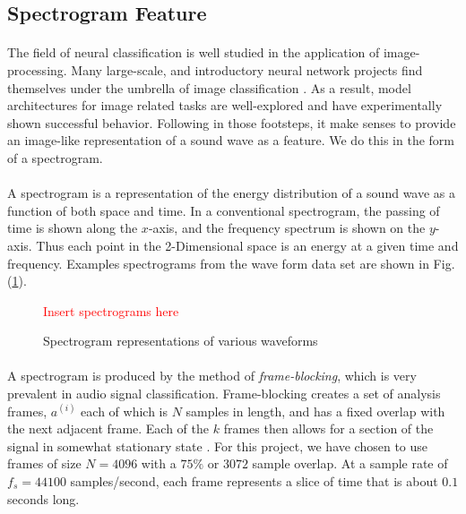 \documentclass[12pt,letterpaper]{article}
\begin{document}

\newpage

\subsection{Spectrogram Feature}
\label{subsec-spectrogram}

\paragraph*{}The field of neural classification is well studied in the application of image-processing. Many large-scale, and introductory neural network projects find themselves under the umbrella of image classification \cite{Geron,Goodfellow,Loy,Mierswa}. As a result, model architectures for image related tasks are well-explored and have experimentally shown successful behavior. Following in those footsteps, it make senses to provide an image-like representation of a sound wave as a feature. We do this in the form of a spectrogram.

\paragraph*{}A spectrogram is a representation of the energy distribution of a sound wave as a function of both space and time. In a conventional spectrogram, the passing of time is shown along the $x$-axis, and the frequency spectrum is shown on the $y$-axis. Thus each point in the 2-Dimensional space is an energy at a given time and frequency. Examples spectrograms from the wave form data set are shown in Fig. (\ref{fig-spectrograms}).

\begin{figure}[H]
\begin{center}
\label{fig-spectrograms}
\textcolor{red}{Insert spectrograms here}
\caption{Spectrogram representations of various waveforms}
\end{center}
\end{figure}

\paragraph*{}A spectrogram is produced by the method of \textit{frame-blocking}, which is very prevalent in audio signal classification. Frame-blocking creates a set of analysis frames, $a^{(i)}$ each of which is $N$ samples in length, and has a fixed overlap with the next adjacent frame. Each of the $k$ frames then allows for a section of the signal in somewhat stationary state \cite{Liu,Zhan,Kahn,Virtanen}. For this project, we have chosen to use frames of size $N = 4096$ with a $75\%$ or $3072$ sample overlap. At a sample rate of $f_s = 44100$ samples/second, each frame represents a slice of time that is about $0.1$ seconds long. 
\end{document}
